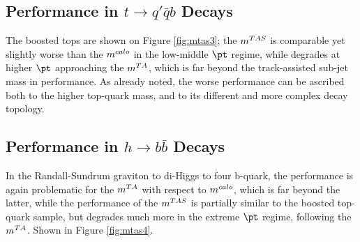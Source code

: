 \subsection{Performance in $t\to q'\bar{q}b$ Decays}
The boosted tops are shown on Figure \ref{fig:mtas3}; the $m^{TAS}$ is comparable yet slightly worse than the $m^{calo}$ in the low-middle $\pt$ regime, while degrades at higher $\pt$ approaching the $m^{TA}$, which is far beyond the track-assisted sub-jet mass in performance.
As already noted, the worse performance can be ascribed both to the higher top-quark mass, and to its different and more complex decay topology.



\subsection{Performance in $h\to b\bar{b}$ Decays}
In the Randall-Sundrum graviton to di-Higgs to four b-quark, the performance is again problematic for the $m^{TA}$ with respect to $m^{calo}$, which is far beyond the latter, while the performance of the $m^{TAS}$ is partially similar to the boosted top-quark sample, but degrades much more in the extreme $\pt$ regime, following the $m^{TA}$. Shown in Figure \ref{fig:mtas4}.



